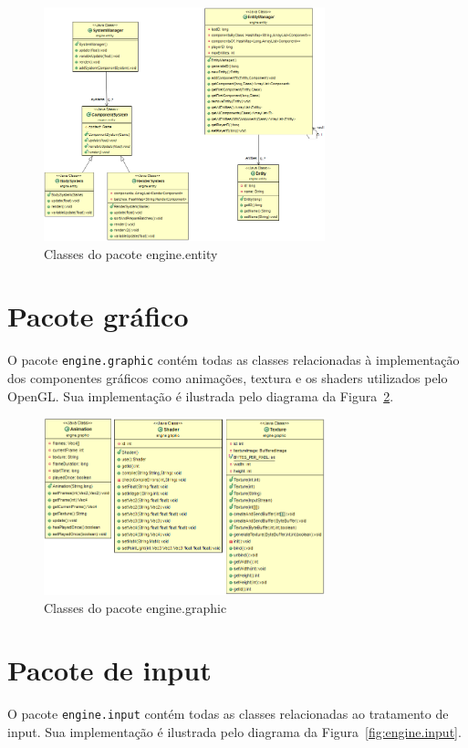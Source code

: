 \documentclass[12pt, 
openright, 
oneside, 
a4paper,    
brazil]{facom-ufu-abntex2}
\begin{document}
\begin{figure}[H]
	\centering
	\includegraphics[width=22em]{imagens/engine.entity.png}
	\caption{Classes do pacote engine.entity}
	\label{fig:engine.entity}
\end{figure}

\section{Pacote gráfico}

O pacote \texttt{engine.graphic} contém todas as classes relacionadas à implementação dos componentes gráficos como animações, textura e os shaders utilizados pelo OpenGL. Sua implementação é ilustrada pelo diagrama da Figura~\ref{fig:engine.graphic}.

\begin{figure}[H]
	\centering
	\includegraphics[width=22em]{imagens/engine.graphic.png}
	\caption{Classes do pacote engine.graphic}
	\label{fig:engine.graphic}
\end{figure}


\section{Pacote de input}

O pacote \texttt{engine.input} contém todas as classes relacionadas ao tratamento de input. Sua implementação é ilustrada pelo diagrama da Figura~\ref{fig:engine.input}.
\end{document}
